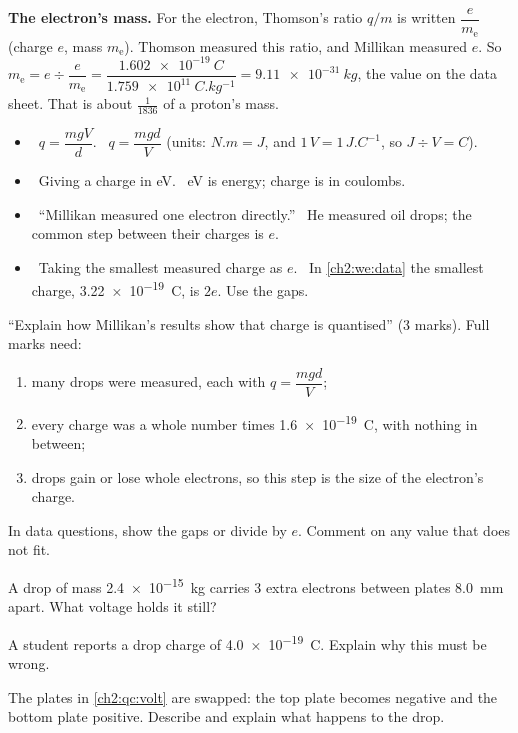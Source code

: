 \textbf{The electron's mass.} For the electron, Thomson's ratio $q/m$ is written
$\dfrac{e}{m_\mathrm{e}}$ (charge $e$, mass $m_\mathrm{e}$). Thomson measured this
ratio, and Millikan measured $e$. So
$m_\mathrm{e} = e \div \dfrac{e}{m_\mathrm{e}}
= \dfrac{\qty{1.602e-19}{C}}{\qty{1.759e11}{C.kg^{-1}}} = \qty{9.11e-31}{kg}$,
the value on the data sheet. That is about $\tfrac{1}{1836}$ of a proton's mass.

\begin{mistakes}
\begin{itemize}
  \item \xmark\ $q = \dfrac{mgV}{d}$. \cmark\ $q = \dfrac{mgd}{V}$
        (units: $\unit{N.m} = \unit{J}$, and $\unit{1\,V} = \unit{1\,J.C^{-1}}$,
        so $\unit{J}\div\unit{V} = \unit{C}$).
  \item \xmark\ Giving a charge in eV. \cmark\ eV is energy; charge is in coulombs.
  \item \xmark\ ``Millikan measured one electron directly.'' \cmark\ He measured
        oil drops; the common step between their charges is $e$.
  \item \xmark\ Taking the smallest measured charge as $e$. \cmark\ In
        \cref{ch2:we:data} the smallest charge, \qty{3.22e-19}{C}, is $2e$. Use the gaps.
\end{itemize}
\end{mistakes}

\begin{examtip}
``Explain how Millikan's results show that charge is quantised'' (3 marks).
Full marks need:
\begin{enumerate}
  \item many drops were measured, each with $q = \dfrac{mgd}{V}$;
  \item every charge was a whole number times \qty{1.6e-19}{C}, with nothing in between;
  \item drops gain or lose whole electrons, so this step is the size of the
        electron's charge.
\end{enumerate}
In data questions, show the gaps or divide by $e$. Comment on any value that
does not fit.
\end{examtip}

\begin{quickcheck}
  \item A drop of mass \qty{2.4e-15}{kg} carries 3 extra electrons between plates
        \qty{8.0}{mm} apart. What voltage holds it still?\label{ch2:qc:volt}
  \item A student reports a drop charge of \qty{4.0e-19}{C}. Explain why this
        must be wrong.
  \item The plates in \cref{ch2:qc:volt} are swapped: the top plate becomes
        negative and the bottom plate positive. Describe and explain what
        happens to the drop.
\end{quickcheck}


